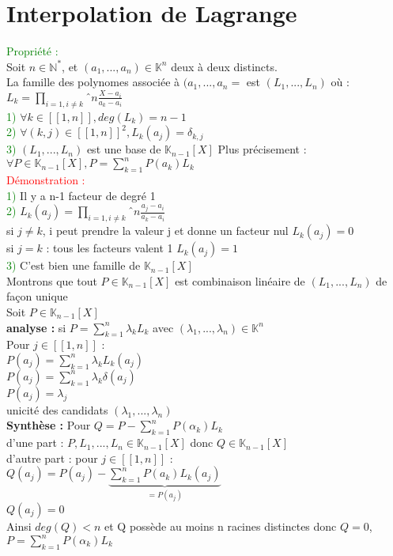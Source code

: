 \documentclass{article}
\begin{document}
\section{Interpolation de Lagrange}
\textcolor{green}{Propriété :} \\
Soit $n \in \mathbb N^*$, et $(a_1,...,a_n) \in \mathbb K^n$ deux à deux distincts. \\
La famille des polynomes associée à $(a_1,...,a_n=$ est $(L_1,...,L_n)$ où : \\
$L_k=\prod_{i=1,i \neq k}ˆn \frac{X-a_i}{a_k-a_i}$ \\
\textcolor{green}{1)} $\forall k \in [[1,n]], deg(L_k)=n-1$ \\
\textcolor{green}{2)} $\forall (k,j) \in [[1,n]]^2, L_k(a_j)=\delta_{k,j}$ \\
\textcolor{green}{3)} $(L_1,...,L_n)$ est une base de $\mathbb K_{n-1} [X] $ Plus précisement : \\
$\forall P \in \mathbb K_{n-1} [X], P= \sum_{k=1}^n P(a_k) L_k$ \\
\textcolor{red}{Démonstration :} \\
\textcolor{green}{1)} Il y a n-1 facteur de degré 1 \\
\textcolor{green}{2)} $L_k(a_j)=\prod_{i=1,i \neq k}ˆn \frac{a_j-a_i}{a_k-a_i}$ \\
si $j \neq k$, i peut prendre la valeur j et donne un facteur nul $L_k(a_j)=0$ \\
si $j=k$ : tous les facteurs valent 1 $L_k(a_j)=1$ \\
\textcolor{green}{3)} C'est bien une famille de $\mathbb K_{n-1} [X] $ \\
Montrons que tout $P \in \mathbb K_{n-1} [X]$ est combinaison linéaire de $(L_1,...,L_n)$ de façon unique \\
Soit $P \in \mathbb K_{n-1} [X]$ \\
{\bf analyse :} si $P= \sum_{k=1}^n \lambda_k L_k$ avec $(\lambda_1,...,\lambda_n) \in \mathbb K^n$ \\
Pour $j \in [[1,n]]$ : \\
$P(a_j)= \sum_{k=1}^n \lambda_k L_k(a_j) $ \\
$P(a_j)= \sum_{k=1}^n \lambda_k \delta(a_j) $ \\
$P(a_j)= \lambda_j $ \\
unicité des candidats $(\lambda_1,..., \lambda_n)$ \\
{\bf Synthèse :} Pour $Q=P- \sum_{k=1}^n P(\alpha_k) L_k$ \\
d'une part : $P,L_1,...,L_n \in \mathbb K_{n-1} [X]$ donc $Q \in \mathbb K_{n-1} [X]$ \\
d'autre part : pour $j \in [[1,n ]]$ : \\
$Q(a_j)=P(a_j)-\underbrace{\sum_{k=1}^n P(a_k) L_k(a_j)}_{=P(a_j)}$ \\
$Q(a_j)=0$ \\
Ainsi $deg(Q)<n$ et Q possède au moins n racines distinctes donc $Q=0$, $P= \sum_{k=1}^n P(\alpha_k) L_k$ \\
\end{document}
